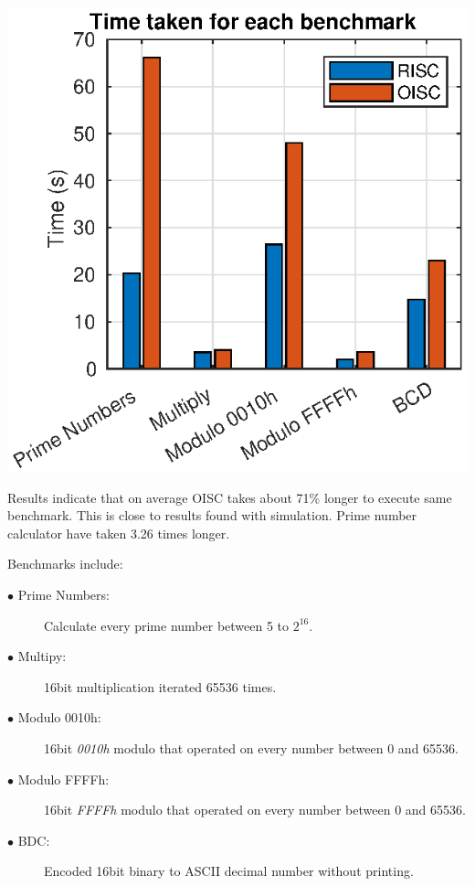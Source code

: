 \begin{colfigure}
	\centering
	\includegraphics[width=\linewidth]{../tests/timing.eps}
	\label{fig:timing}
\end{colfigure}

Results indicate that on average OISC takes about 71\% longer to execute same benchmark. This is close to results found with simulation. Prime number calculator have taken 3.26 times longer.

Benchmarks include:
\begin{description}
	\item[$\bullet$ Prime Numbers:] Calculate every prime number between 5 to $2^{16}$.  
	\item[$\bullet$ Multipy:] 16bit multiplication iterated 65536 times.
	\item[$\bullet$ Modulo 0010h:] 16bit \textit{0010h} modulo that operated on every number between 0 and 65536.
	\item[$\bullet$ Modulo FFFFh:] 16bit \textit{FFFFh} modulo that operated on every number between 0 and 65536.
	\item[$\bullet$ BDC:] Encoded 16bit binary to ASCII decimal number without printing.
\end{description}


